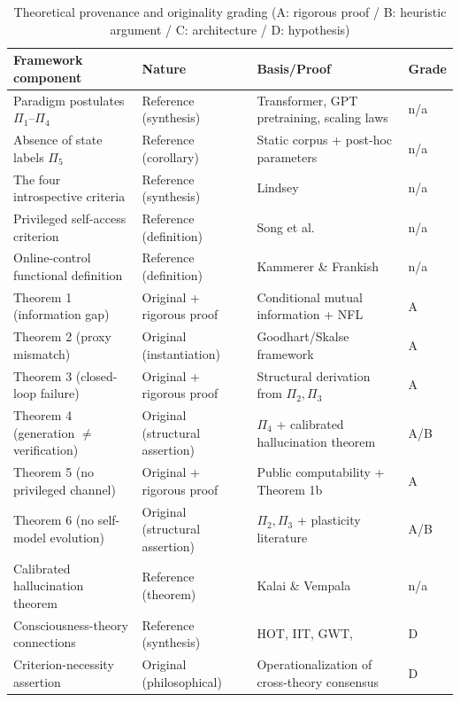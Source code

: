 \begin{table}[htbp]
\centering
\caption{Theoretical provenance and originality grading (A: rigorous proof / B: heuristic
argument / C: architecture / D: hypothesis) \label{tab:provenance}}
\small
\setlength{\tabcolsep}{4pt}
\begin{tabular}{p{5.0cm}p{3.0cm}p{5.4cm}p{1.2cm}}
\toprule
Framework component & Nature & Basis/Proof & Grade \\
\midrule
Paradigm postulates $\Pi_1$--$\Pi_4$ & Reference (synthesis) & Transformer\cite{vaswani-2017-attention},
GPT pretraining\cite{brown-2020-gpt3}, scaling laws\cite{kaplan-2020-scaling,
hoffmann-2022-chinchilla} & n/a \\
Absence of state labels $\Pi_5$ & Reference (corollary) & Static corpus + post-hoc parameters & n/a \\
The four introspective criteria & Reference (synthesis) & Lindsey\cite{lindsey-2026-introspection} & n/a \\
Privileged self-access criterion & Reference (definition) & Song et al.\cite{song-privileged-2025} & n/a \\
Online-control functional definition & Reference (definition) & Kammerer \& Frankish\cite{kammerer-frankish-2023} & n/a \\
Theorem 1 (information gap) & Original + rigorous proof & Conditional mutual information + NFL & A \\
Theorem 2 (proxy mismatch) & Original (instantiation) & Goodhart/Skalse framework & A \\
Theorem 3 (closed-loop failure) & Original + rigorous proof & Structural derivation from $\Pi_2,\Pi_3$ & A \\
Theorem 4 (generation $\neq$ verification) & Original (structural assertion) & $\Pi_4$ + calibrated hallucination theorem & A/B \\
Theorem 5 (no privileged channel) & Original + rigorous proof & Public computability + Theorem 1b & A \\
Theorem 6 (no self-model evolution) & Original (structural assertion) & $\Pi_2,\Pi_3$ + plasticity literature & A/B \\
Calibrated hallucination theorem & Reference (theorem) & Kalai \& Vempala\cite{kalai-vempala-2023-calib} & n/a \\
Consciousness-theory connections & Reference (synthesis) & HOT\cite{rosendahl-2005}, IIT\cite{albantakis-2023-iit},
GWT\cite{baars-1993}, \cite{chalmers-2023-conscious, butlin-2023-conscious} & D \\
Criterion-necessity assertion & Original (philosophical) & Operationalization of cross-theory consensus & D \\
\bottomrule
\end{tabular}
\end{table}

